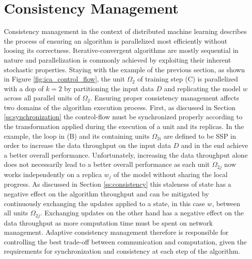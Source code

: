 
\chapter{Consistency Management}
\label{c:consistency_mgmt}
Consistency management in the context of distributed machine learning describes the process of ensuring an algorithm is parallelized most efficiently without loosing its correctness.
Iterative-convergent algorithms are mostly sequential in nature and parallelization is commonly achieved by exploiting their inherent stochastic properties.
Staying with the example of the previous section, as shown in Figure \ref{fig:ica_control_flow}, the unit $\Omega_2$ of training step (C) is parallelized with a dop of $k = 2$ by partitioning the input data $D$ and replicating the model $w$ across all parallel units of $\Omega_2$.
Ensuring proper consistency management affects two domains of the algorithm execution process.
First, as discussed in Section \ref{ss:synchronization} the control-flow must be synchronized properly according to the transformation applied during the execution of a unit and its replicas.
In the example, the loop in (B) and its containing units $\Omega_{2i}$ are defined to be SSP in order to increase the data throughput on the input data $D$ and in the end achieve a better overall performance.
Unfortunately, increasing the data throughput alone does not necessarily lead to a better overall performance as each unit $\Omega_{2j}$ now works independently on a replica $w_j$ of the model without sharing the local progress.
As discussed in Section \ref{ss:consistency} this staleness of state has a negative effect on the algorithm throughput and can be mitigated by continuously exchanging the updates applied to a state, in this case $w$, between all units $\Omega_{2j}$.
Exchanging updates on the other hand has a negative effect on the data throughput as more computation time must be spent on network management.
Adaptive consistency management therefore is responsible for controlling the best trade-off between communication and computation, given the requirements for synchronization and consistency at each step of the algorithm.

